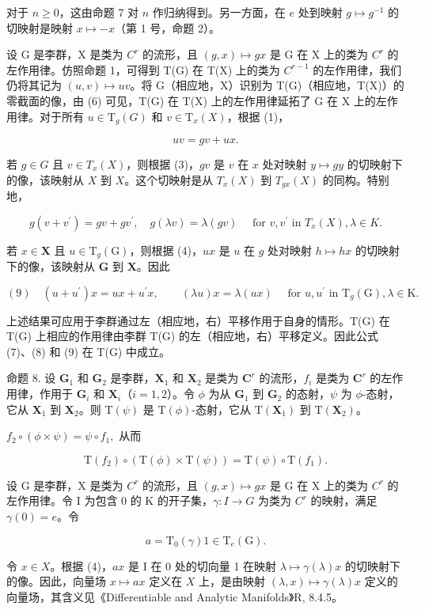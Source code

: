 对于 \(n \geqslant 0\)，这由命题 7 对 \(n\) 作归纳得到。另一方面，在 \(e\) 处到映射 \(g \mapsto g^{-1}\) 的切映射是映射 \(x \mapsto -x\)（第 1 号，命题 2）。

设 G 是李群，X 是类为 \(C^r\) 的流形，且 \((g, x) \mapsto gx\) 是 G 在 X 上的类为 \(C^r\) 的左作用律。仿照命题 1，可得到 T(G) 在 T(X) 上的类为 \(C^{r-1}\) 的左作用律，我们仍将其记为 \((u, v) \mapsto uv\)。将 G（相应地，X）识别为 T(G)（相应地，T(X)）的零截面的像，由 (6) 可见，T(G) 在 T(X) 上的左作用律延拓了 G 在 X 上的左作用律。对于所有 \(u \in \mathrm{T}_{g}(G)\) 和 \(v \in \mathrm{T}_{x}(X)\)，根据 (1)，

\[
u v = g v + u x.\tag{7}
\]

若 \(g \in G\) 且 \(v \in T_x(X)\)，则根据 (3)，\(gv\) 是 \(v\) 在 \(x\) 处对映射 \(y \mapsto gy\) 的切映射下的像，该映射从 \(X\) 到 \(X\)。这个切映射是从 \(T_x(X)\) 到 \(T_{gx}(X)\) 的同构。特别地，

\[
g (v + v ^ {\prime}) = g v + g v ^ {\prime}, \quad g (\lambda v) = \lambda (g v) \quad \text { for } v, v ^ {\prime} \text { in } T _ {x} (X), \lambda \in K.\tag{8}
\]

若 \(x \in \mathbf{X}\) 且 \(u \in \mathrm{T}_g(\mathrm{G})\)，则根据 (4)，\(ux\) 是 \(u\) 在 \(g\) 处对映射 \(h \mapsto hx\) 的切映射下的像，该映射从 \(\mathbf{G}\) 到 \(\mathbf{X}\)。因此

\[
(9) \quad (u + u ^ {\prime}) x = u x + u ^ {\prime} x, \qquad (\lambda u) x = \lambda (u x) \quad \text { for } u, u ^ {\prime} \text { in } \mathrm{T} _ {g} (\mathrm{G}), \lambda \in \mathrm{K}.
\]

上述结果可应用于李群通过左（相应地，右）平移作用于自身的情形。T(G) 在 T(G) 上相应的作用律由李群 T(G) 的左（相应地，右）平移定义。因此公式 (7)、(8) 和 (9) 在 T(G) 中成立。

命题 8. 设 \(\mathbf{G}_1\) 和 \(\mathbf{G}_2\) 是李群，\(\mathbf{X}_1\) 和 \(\mathbf{X}_2\) 是类为 \(\mathbf{C}^r\) 的流形，\(f_i\) 是类为 \(\mathbf{C}^r\) 的左作用律，作用于 \(\mathbf{G}_i\) 和 \(\mathbf{X}_i\)（\(i = 1, 2\)）。令 \(\phi\) 为从 \(\mathbf{G}_1\) 到 \(\mathbf{G}_2\) 的态射，\(\psi\) 为 \(\phi\)-态射，它从 \(\mathbf{X}_1\) 到 \(\mathbf{X}_2\)。则 \(\mathrm{T}(\psi)\) 是 \(\mathrm{T}(\phi)\)-态射，它从 \(\mathrm{T}(\mathbf{X}_1)\) 到 \(\mathrm{T}(\mathbf{X}_2)\)。

\(f_{2}\circ (\phi \times \psi) = \psi \circ f_{1},\) 从而

\[
\mathrm{T} (f _ {2}) \circ (\mathrm{T} (\phi) \times \mathrm{T} (\psi)) = \mathrm{T} (\psi) \circ \mathrm{T} (f _ {1}).
\]

设 G 是李群，X 是类为 \(C^{r}\) 的流形，且 \((g, x) \mapsto gx\) 是 G 在 X 上的类为 \(C^{r}\) 的左作用律。令 I 为包含 0 的 K 的开子集，\(\gamma: I \to G\) 为类为 \(C^{r}\) 的映射，满足 \(\gamma(0) = e\)。令

\[
a = \mathrm{T} _ {0} (\gamma) 1 \in \mathrm{T} _ {e} (\mathrm{G}).
\]

令 \(x \in X\)。根据 (4)，\(ax\) 是 I 在 0 处的切向量 1 在映射 \(\lambda \mapsto \gamma(\lambda)x\) 的切映射下的像。因此，向量场 \(x \mapsto ax\) 定义在 \(X\) 上，是由映射 \((\lambda, x) \mapsto \gamma(\lambda)x\) 定义的向量场，其含义见《Differentiable and Analytic Manifolds》R, 8.4.5。
